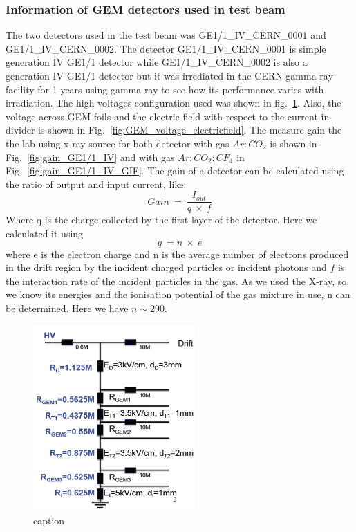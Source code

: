 \subsubsection{Information of GEM detectors used in test beam} %
\label{ssub:information_of_gem_detectors_used_in_test_beam}
The two detectors used in the test beam was GE1/1\_IV\_CERN\_0001 and GE1/1\_IV\_CERN\_0002. The detector GE1/1\_IV\_CERN\_0001 is simple generation IV GE1/1 detector while GE1/1\_IV\_CERN\_0002 is also a generation IV GE1/1 detector but it was irrediated in the CERN gamma ray facility for 1 years using gamma ray to see how its performance varies with irradiation. The high voltages configuration used was shown in fig.~\ref{fig:HV_configuration}. Also, the voltage across GEM foils and  the electric field  with respect to the current in divider is shown in Fig.~\ref{fig:GEM_voltage_electricfield}. The measure gain the the lab using x-ray source for both detector with gas $Ar:CO_2$ is shown in Fig.~\ref{fig:gain_GE1/1_IV} and with gas $Ar:CO_2:CF_4$ in Fig.~\ref{fig:gain_GE1/1_IV_GIF}. The gain of a detector can be calculated using the ratio of output and input current, like:
\begin{equation}
    Gain~=~\frac{I_{out}}{q~\times~f}
\end{equation}
Where q is the charge collected by the first layer of the detector. Here we calculated it using
\begin{equation}
    q~= n~\times~e
\end{equation}
where e is the electron charge and n is the average number of electrons produced in the drift region by the incident charged particles or incident photons and $f$ is the interaction rate of the incident particles in the gas. As we used the X-ray, so, we know its energies and the ionisation potential of the gas mixture in use, n can be determined. Here we have $n\sim 290$.
\begin{figure}[htbp]
    \centering
    \includegraphics[width=0.55\textwidth]{figures/GEM/HV_divider_gem_testbeam_2014.jpeg}
    \caption{caption}
    \label{fig:HV_configuration}
\end{figure}
